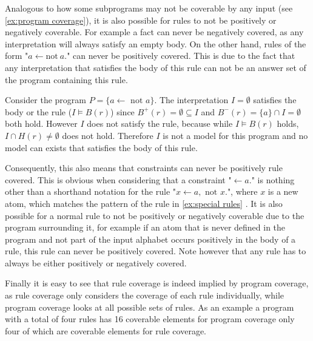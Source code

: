 Analogous to how some subprograms may not be coverable by any input (see \cref{ex:program coverage}), it is also possible for rules to not be positively or negatively coverable. For example a fact can never be negatively covered, as any interpretation will always satisfy an empty body. On the other hand, rules of the form "\(a \leftarrow \text{not}\ a.\)" can never be positively covered. This is due to the fact that any interpretation that satisfies the body of this rule can not be an answer set of the program containing this rule.

\begin{example}
\label{ex:special rules}
    Consider the program \(P = \{a \leftarrow \text{ not } a\}\).
    The interpretation \(I = \emptyset\) satisfies the body or the rule (\(I \models B(r)\)) since \(B^+(r) = \emptyset \subseteq I\) and \(B^-(r) = \{a\} \cap I = \emptyset\) both hold. However $I$ does not satisfy the rule, because while \(I \models B(r)\) holds, \(I \cap H(r) \neq \emptyset\) does not hold. Therefore $I$ is not a model for this program and no model can exists that satisfies the body of this rule.
\end{example}

Consequently, this also means that constraints can never be positively rule covered. This is obvious when considering that a constraint "\(\leftarrow a.\)" is nothing other than a shorthand notation for the rule "\(x \leftarrow a, \text{ not } x.\)", where $x$ is a new atom, which matches the pattern of the rule in \cref{ex:special rules} \cite[p. 17]{Geb+12}. It is also possible for a normal rule to not be positively or negatively coverable due to the program surrounding it, for example if an atom that is never defined in the program and not part of the input alphabet occurs positively in the body of a rule, this rule can never be positively covered. Note however that any rule has to always be either positively or negatively covered.

Finally it is easy to see that rule coverage is indeed implied by program coverage, as rule coverage only considers the coverage of each rule individually, while program coverage looks at all possible sets of rules. As an example a program with a total of four rules has 16 coverable elements for program coverage only four of which are coverable elements for rule coverage.

